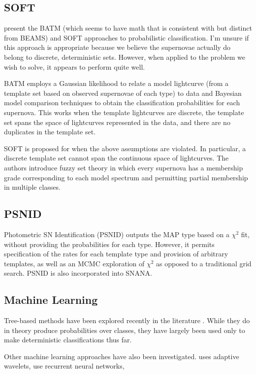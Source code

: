 \documentclass[12pt, onecolumn]{emulateapj}
\begin{document}
\subsection{SOFT}

\citep{Rodney09, Rodney10} present the BATM (which seems to have math that is consistent with but distinct from BEAMS) and SOFT approaches to probabilistic classification.  I'm unsure if this approach is appropriate because we believe the supernovae actually do belong to discrete, deterministic sets.  However, when applied to the problem we wish to solve, it appears to perform quite well.

BATM employs a Gaussian likelihood to relate a model lightcurve (from a template set based on observed supernovae of each type) to data and Bayesian model comparison techniques to obtain the classification probabilities for each supernova.  This works when the template lightcurves are discrete, the template set spans the space of lightcurves represented in the data, and there are no duplicates in the template set.  

SOFT is proposed for when the above assumptions are violated.  In particular, a discrete template set cannot span the continuous space of lightcurves.  The authors introduce fuzzy set theory in which every supernova has a membership grade corresponding to each model spectrum and permitting partial membership in multiple classes.  

\subsection{PSNID}

Photometric SN Identification (PSNID) \citep{Sako11} outputs the MAP type based on a $\chi^{2}$ fit, without providing the probabilities for each type.  However, it permits specification of the rates for each template type and provision of arbitrary templates, as well as an MCMC exploration of $\chi^{2}$ as opposed to a traditional grid search.  PSNID is also incorporated into SNANA.

\subsection{Machine Learning}

Tree-based methods have been explored recently in the literature \citep{Richards11, Lochner16, Moller16}.  While they do in theory produce probabilities over classes, they have largely been used only to make deterministic classifications thus far.  

Other machine learning approaches have also been investigated.  \citet{Varughese15} uses adaptive wavelets, \citet{Karpenka12, Charnock16} use recurrent neural networks, 




\end{document}
